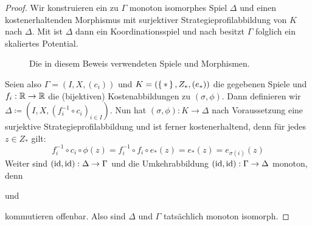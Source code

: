 \begin{proof}
	Wir konstruieren ein zu $\Gamma$ monoton isomorphes Spiel $\Delta$ und einen kostenerhaltenden Morphismus mit surjektiver Strategieprofilabbildung von $K$ nach $\Delta$. Mit  ist $\Delta$ dann ein Koordinationsspiel und nach  besitzt $\Gamma$ folglich ein skaliertes Potential.
	\begin{figure}[h]\centering
		\caption{Die in diesem Beweis verwendeten Spiele und Morphismen.}
	\end{figure}		
	Seien also $\Gamma = (I, X, (c_i))$  und $K = (\set{\ast}, Z_\ast, (e_\ast))$ die gegebenen Spiele und $f_i: \mathbb{R} \to \mathbb{R}$ die (bijektiven) Kostenabbildungen zu $(\sigma, \phi)$. Dann definieren wir $\Delta \coloneqq (I, X, (f_i^{-1}\circ c_i)_{i \in I})$. Nun hat $(\sigma, \phi): K \to \Delta$ nach Voraussetzung eine surjektive Strategieprofilabbildung und ist ferner kostenerhaltend, denn für jedes $z \in Z_\ast$ gilt:
		\[f_i^{-1}\circ c_i \circ \phi(z) = f_i^{-1} \circ f_i \circ e_\ast(z) = e_\ast(z) = e_{\sigma(i)}(z) \]
	Weiter sind $(\mathrm{id}, \mathrm{id}): \Delta \to \Gamma$ und die Umkehrabbildung $(\mathrm{id}, \mathrm{id}): \Gamma \to \Delta$ monoton, denn
	\begin{center}
			und
	\end{center}		
	kommutieren offenbar. Also sind $\Delta$ und $\Gamma$ tatsächlich monoton isomorph.
\end{proof}

